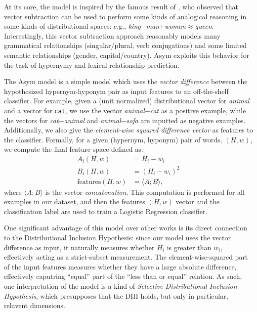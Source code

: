 \documentclass[12pt]{article}
\begin{document}
At its core, the model is inspired by the famous result of
, who observed that vector subtraction can be used
to perform some kinds of analogical reasoning in some kinds of distributional
spaces: e.g., {\em king}$ - ${\em man}$ + ${\em woman}$ \approx ${\em queen}.
Interestingly, this vector subtraction approach reasonably models many
grammatical relationships (singular/plural, verb conjugations) and some limited
semantic relationships (gender, capital/country). Asym exploits this
behavior for the task of hypernymy and lexical relationship prediction.

The Asym model is a simple model which uses the {\em vector difference} between
the hypothesized hypernym-hyponym pair as input features to an off-the-shelf
classifier. For example, given a (unit normalized) distributional vector for
{\em animal} and a vector for {\tt cat}, we use the vector
{\em animal}$ - ${\em cat} as a positive example, while the
vectors for {\em cat}$ - ${\em animal} and {\em animal}$ - ${\em sofa} are
inputted as negative examples. Additionally, we also give the {\em element-wise
squared difference vector} as features to the classifier. Formally, for a given
(hypernym, hyponym) pair of words, $(H, w)$, we compute the final feature space
defined as:
\begin{align*}
  A_i(H, w) & = H_i - w_i\\
  B_i(H, w) & = (H_i - w_i)^2\\
  \text{features}(H, w) & = \langle A; B\rangle,
\end{align*}
where $\langle A; B\rangle$ is the vector {\em concatenation}. This computation
is performed for all examples in our dataset, and then the features $(H, w)$
vector and the classification label are used to train a Logistic Regression
classifier.

One significant advantage of this model over other works is its direct
connection to the Distributional Inclusion Hypothesis: since our model uses the
vector difference as input, it naturally measures whether $H_i$ is
greater than $w_i$, effectively acting as a strict-subset measurement. The
element-wise-squared part of the input features measures whether they have a
large absolute difference, effectively caputring ``equal'' part of the
``less than or equal'' relation. As such, one interpretation of the model is a
kind of {\em Selective Distributional Inclusion Hypothesis}, which presupposes
that the DIH holds, but only in particular, relavent dimensions.
\end{document}
